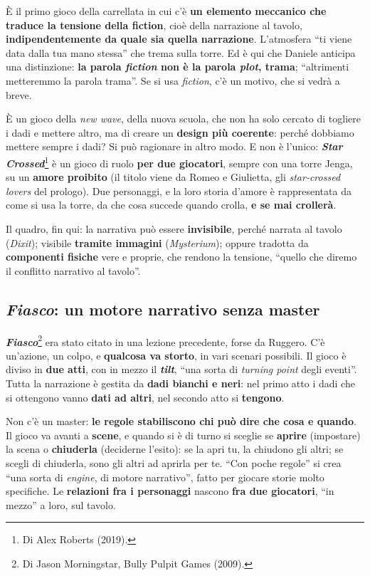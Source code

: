 È il primo gioco della carrellata in cui c'è \textbf{un elemento meccanico che traduce la
tensione della fiction}, cioè della narrazione al tavolo, \textbf{indipendentemente da quale sia
quella narrazione}. L'atmosfera ``ti viene data dalla tua mano stessa'' che trema sulla torre.
Ed è qui che Daniele anticipa una distinzione: \textbf{la parola \emph{fiction} non è la parola
\emph{plot}, trama}; ``altrimenti metteremmo la parola trama''. Se si usa \emph{fiction}, c'è un
motivo, che si vedrà a breve.

È un gioco della \emph{new wave}, della nuova scuola, che non ha solo cercato di togliere i dadi
e mettere altro, ma di creare un \textbf{design più coerente}: perché dobbiamo mettere sempre i
dadi? Si può ragionare in altro modo. E non è l'unico: \textbf{\emph{Star Crossed}}\footnote{Di
Alex Roberts (2019).} è un gioco di ruolo \textbf{per due giocatori}, sempre con una torre
Jenga, su un \textbf{amore proibito} (il titolo viene da Romeo e Giulietta, gli
\emph{star-crossed lovers} del prologo). Due personaggi, e la loro storia d'amore è rappresentata
da come si usa la torre, da che cosa succede quando crolla, \textbf{e se mai crollerà}.

Il quadro, fin qui: la narrativa può essere \textbf{invisibile}, perché narrata al tavolo
(\emph{Dixit}); visibile \textbf{tramite immagini} (\emph{Mysterium}); oppure tradotta da
\textbf{componenti fisiche} vere e proprie, che rendono la tensione, ``quello che diremo il
conflitto narrativo al tavolo''.

\subsection{\emph{Fiasco}: un motore narrativo senza master}



\textbf{\emph{Fiasco}}\footnote{Di Jason Morningstar, Bully Pulpit Games (2009).} era stato citato
in una lezione precedente, forse da Ruggero. C'è un'azione, un colpo, e \textbf{qualcosa va
storto}, in vari scenari possibili. Il gioco è diviso in \textbf{due atti}, con in mezzo il
\textbf{\emph{tilt}}, ``una sorta di \emph{turning point} degli eventi''. Tutta la narrazione è
gestita da \textbf{dadi bianchi e neri}: nel primo atto i dadi che si ottengono vanno
\textbf{dati ad altri}, nel secondo atto si \textbf{tengono}.

Non c'è un master: \textbf{le regole stabiliscono chi può dire che cosa e quando}. Il gioco va
avanti a \textbf{scene}, e quando si è di turno si sceglie se \textbf{aprire} (impostare) la
scena o \textbf{chiuderla} (deciderne l'esito): se la apri tu, la chiudono gli altri; se scegli
di chiuderla, sono gli altri ad aprirla per te. ``Con poche regole'' si crea ``una sorta di
\emph{engine}, di motore narrativo'', fatto per giocare storie molto specifiche. Le
\textbf{relazioni fra i personaggi} nascono \textbf{fra due giocatori}, ``in mezzo'' a loro, sul
tavolo.

